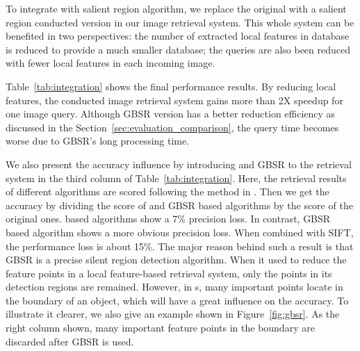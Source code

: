 To integrate with salient region algorithm, we replace the original {\lfea} with a salient region conducted version in our image retrieval system. This whole system can be benefited in two perspectives: the number of extracted local features in database is reduced to provide a much smaller database; the queries are also been reduced with fewer local features in each incoming image.

Table~\ref{tab:integration} shows the final performance results. By reducing local features, the {\sys} conducted image retrieval system gains more than 2X speedup for one image query. Although GBSR version has a better reduction efficiency as discussed in the Section~\ref{sec:evaluation_comparison}, the query time becomes worse due to GBSR's long processing time.

We also present the accuracy influence by introducing {\sys} and GBSR to the retrieval system in the third column of Table~\ref{tab:integration}. Here, the retrieval results of different algorithms are scored following the method in \cite{nister2006scalable}. Then we get the accuracy by dividing the score of {\sys} and GBSR based algorithms by the score of the original ones. {\sys} based algorithms show a 7\% precision loss. In contrast, GBSR based algorithm shows a more obvious precision loss. When combined with SIFT, the performance loss is about 15\%. The major reason behind such a result is that GBSR is a precise silent region detection algorithm. When it used to reduce the feature points in a local feature-based retrieval system, only the points in its detection regions are remained. However, in {\lfea}s, many important points locate in the boundary of an object, which will have a great influence on the accuracy. To illustrate it clearer, we also give an example shown in Figure~\ref{fig:gbsr}. As the right column shown, many important feature points in the boundary are discarded after GBSR is used. 

